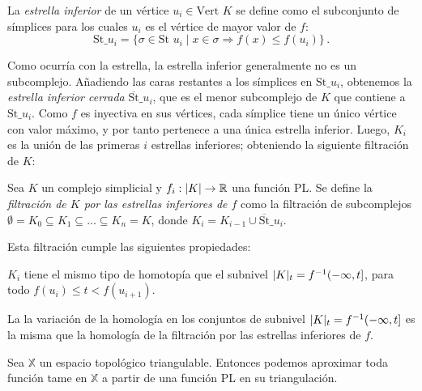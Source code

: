 \begin{definition}
La \emph{estrella inferior} de un vértice $u_i \in \text{Vert }K$ se define como el subconjunto de símplices para los cuales $u_i$ es el vértice de mayor valor de $f$:
\[
\text{St}\_u_i = \{\sigma \in \text{St }u_i \mid x \in \sigma \Rightarrow f(x) \leq f(u_i)\}\,.
\] 
\end{definition}

Como ocurría con la estrella, la estrella inferior generalmente no es un subcomplejo. Añadiendo las caras restantes a los símplices en $\text{St}\_u_i$, obtenemos la \emph{estrella inferior cerrada} $\overline{\text{St}}\_u_i$, que es el menor subcomplejo de $K$ que contiene a $\text{St}\_u_i$. Como $f$ es inyectiva en sus vértices, cada símplice tiene un único vértice con valor máximo, y por tanto pertenece a una única estrella inferior. Luego, $K_i$ es la unión de las primeras $i$ estrellas inferiores; obteniendo la siguiente filtración de $K$:

\begin{definition}
Sea $K$ un complejo simplicial y $f_i:\lvert K\rvert \to \mathbb{R}$ una función PL. Se define la \emph{filtración de $K$ por las estrellas inferiores de $f$} como la filtración de subcomplejos $\emptyset = K_0 \subseteq K_1 \subseteq ... \subseteq K_n = K$, donde $K_i=K_{i-1} \cup \overline{\text{St}}\_u_i$. 
\end{definition}

Esta filtración cumple las siguientes propiedades:
\begin{property}
\begin{sloppypar}
$K_i$ tiene el mismo tipo de homotopía que el subnivel ${\lvert K\rvert_t=f^{-1}(-\infty, t]}$, para todo $f(u_i) \leq t < f(u_{i+1})$.
\end{sloppypar}
\end{property}

\begin{property}
\begin{sloppypar}
La la variación de la homología en los conjuntos de subnivel ${\lvert K\rvert_t=f^{-1}(-\infty, t]}$ es la misma que la homología de la filtración por las estrellas inferiores de $f$.
\end{sloppypar}
\end{property}

\begin{property}
Sea $\mathbb{X}$ un espacio topológico triangulable. Entonces podemos aproximar toda función tame en $\mathbb{X}$ a partir de una función PL en su triangulación.
\end{property}




